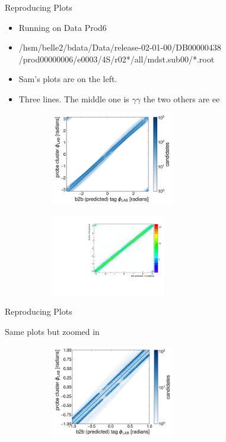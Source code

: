 \documentclass[10pt]{beamer}
\begin{document}
{\begin{frame}{Reproducing Plots}
	\begin{itemize}
		\item Running on Data Prod6
		\item /hsm/belle2/bdata/Data/release-02-01-00/DB00000438 /prod00000006/e0003/4S/r02*/all/mdst.sub00/*.root
		\item Sam's plots are on the left.	
		\item Three lines. The middle one is $\gamma \gamma$ the two others are $\textrm{ee}$
\end{itemize}
	
	
	\begin{figure}
		\centering
		\begin{subfigure}{.5\textwidth}
			\centering
			\includegraphics[width=5.4cm]{Plots/prodRecSam.jpeg}
			
			\label{fig:sub1}
		\end{subfigure}%
		\begin{subfigure}{.5\textwidth}
			\centering
			\includegraphics[width=5cm]{Plots/clusterb2b}
			
			\label{fig:sub2}
		\end{subfigure}
				
		\label{fig:test}
	\end{figure}
	
	
\end{frame}


\begin{frame}{Reproducing Plots}
	
	Same plots but zoomed in
	
		\begin{figure}
		\centering
		\begin{subfigure}{.5\textwidth}
			\centering
			\includegraphics[width=5.4cm]{Plots/ZommedSam.jpeg}
			

\end{subfigure}
\end{figure}
\end{frame}}
\end{document}
